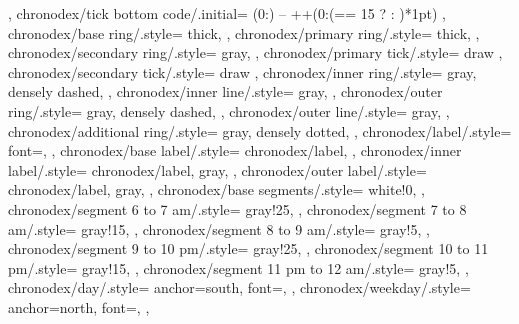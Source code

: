 {{    },
    chronodex/tick bottom code/.initial={
        (0:) --
        ++(0:{(\n == 15 ?  : )*1pt})
    },
    chronodex/base ring/.style={
        thick,
    },
    chronodex/primary ring/.style={
        thick,
    },
    chronodex/secondary ring/.style={
        gray,
    },
    chronodex/primary tick/.style={
        draw
    },
    chronodex/secondary tick/.style={
        draw
    },
    chronodex/inner ring/.style={
        gray,
        densely dashed,
    },
    chronodex/inner line/.style={
        gray,
    },
    chronodex/outer ring/.style={
        gray,
        densely dashed,
    },
    chronodex/outer line/.style={
        gray,
    },
    chronodex/additional ring/.style={
        gray,
        densely dotted,
    },
    chronodex/label/.style={
        font=\footnotesize,
    },
    chronodex/base label/.style={
        chronodex/label,
    },
    chronodex/inner label/.style={
        chronodex/label,
        gray,
    },
    chronodex/outer label/.style={
        chronodex/label,
        gray,
    },
    chronodex/base segments/.style={
        white!0,
    },
    chronodex/segment 6 to 7 am/.style={
        gray!25,
    },
    chronodex/segment 7 to 8 am/.style={
        gray!15,
    },
    chronodex/segment 8 to 9 am/.style={
        gray!5,
    },
    chronodex/segment 9 to 10 pm/.style={
        gray!25,
    },
    chronodex/segment 10 to 11 pm/.style={
        gray!15,
    },
    chronodex/segment 11 pm to 12 am/.style={
        gray!5,
    },
    chronodex/day/.style={
        anchor=south,
        font=\Huge,
    },
    chronodex/weekday/.style={
        anchor=north,
        font=\large,
    },
}%